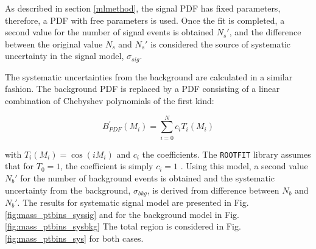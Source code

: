 As described in section \ref{mlmethod}, the signal PDF has fixed parameters, therefore, a PDF with free parameters is used. Once the fit is completed, a second value for the number of signal events is obtained $N_s'$, and the difference between the original value $N_s$ and $N_s'$ is considered the source of systematic uncertainty in the signal model, $\sigma_{sig}$.

The systematic uncertainties from the background are calculated in a similar fashion. The background PDF is replaced by a PDF consisting of a linear combination of Chebyshev polynomials of the first kind:

\begin{equation}
	B_{PDF}^{'}(M_i) = \sum_{i=0}^{N} c_i T_i(M_i) 
\end{equation}

with \cite{mason2002chebyshev} $T_i(M_i) = \cos(iM_i)$ and $c_i$ the coefficients. The \verb|ROOTFIT| library assumes that for $T_0 = 1$, the coefficient is simply $c_i = 1$ \cite{chebyshev}. Using this model, a second value $N_b'$ for the number of background events is obtained and the systematic uncertainty from the background, $\sigma_{bkg}$, is derived from difference between $N_b$ and $N_b'$. The results for systematic signal model are presented in Fig. \ref{fig:mass_ptbins_syssig} and for the background model in Fig. \ref{fig:mass_ptbins_sysbkg} The total region is considered in Fig. \ref{fig:mass_ptbins_sys} for both cases.

